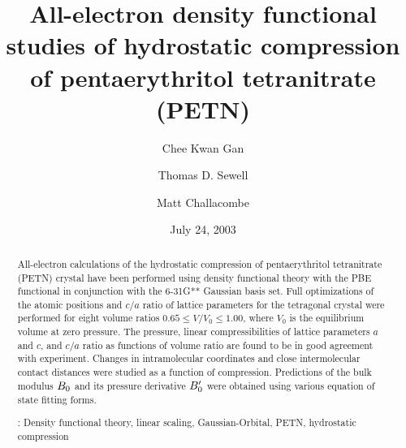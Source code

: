\documentclass[prb,aps,nobibnotes,twocolumn,doublespace,twocolumngrid,superbib]{revtex4}
\begin{document}
\title[Short Title]{ 
All-electron density functional studies of hydrostatic compression of 
pentaerythritol tetranitrate (PETN)}
\author{Chee Kwan Gan\footnotemark[1]}
\author{Thomas D. Sewell\footnotemark[2]}
\author{Matt Challacombe\footnotemark[3]}

\date{July 24, 2003}

\begin{abstract}
All-electron calculations of the hydrostatic compression of
pentaerythritol tetranitrate (PETN) crystal have been performed using
density functional theory with the PBE functional in conjunction with
the 6-31G** Gaussian basis set.  Full optimizations of the atomic
positions and $c/a$ ratio of lattice parameters for the tetragonal
crystal were performed for eight volume ratios $0.65
\le V/V_0 \le 1.00$, where $V_0$ is the equilibrium volume at zero
pressure.  The pressure, linear compressibilities of lattice
parameters $a$ and $c$, and $c/a$ ratio as functions of volume ratio
are found to be in good agreement with experiment.  Changes in
intramolecular coordinates and close intermolecular contact distances
were studied as a function of compression.  Predictions of the bulk
modulus $B_0$ and its pressure derivative ${B'_0}$ were obtained
using various equation of state fitting forms.

\smallskip
{}: Density functional theory, linear scaling, 
Gaussian-Orbital, PETN, hydrostatic compression
\end{abstract}

\maketitle

\end{document}
